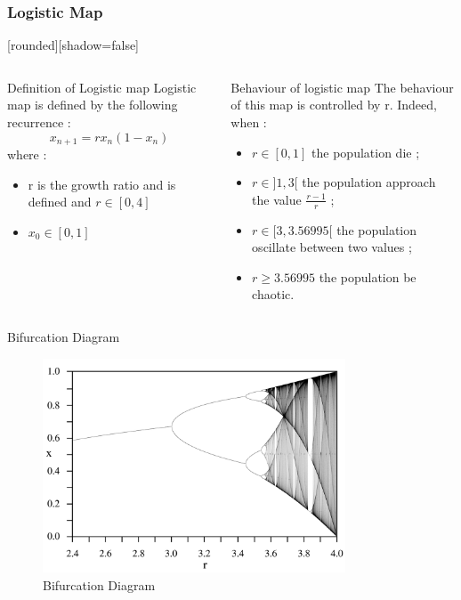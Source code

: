 \documentclass [xcolor=svgnames, t] {beamer}
\begin{document}
\begin{frame}
\frametitle{Logistic Map}
[rounded][shadow=false] 
\begin{columns}[t]
  \begin{column}{5cm}
  \begin{block}{Definition of Logistic map}
 Logistic map is defined  by the following recurrence :
$$x_{n +1} =rx_n(1 - x_n)$$ 
where :
\begin{itemize}
    \item r is the growth ratio and is defined and $r \in [0,4]$
    \item $x_0 \in [0,1]$
\end{itemize}
  \end{block} 
  \end{column}
  
  \begin{column}{5cm}
  \begin{block}{Behaviour of logistic map}
The behaviour of this map is controlled by r. Indeed, when :
\begin{itemize}
    \item $r \in [0,1]$ the population die ;
    \item  $r \in ]1,3[$ the population approach the value $\frac{r-1}{r}$ ;
    \item  $r \in [3, 3.56995[$ the population oscillate between two values ;
    \item $r \geq 3.56995$ the population be chaotic.
\end{itemize}
  \end{block}   
  \end{column}
 \end{columns}

\end{frame}

\begin{frame}{Bifurcation Diagram}
    \begin{figure}[!h]
    \begin{center}
   \caption{\label{étiquette} Bifurcation Diagram}
   \includegraphics[width=9cm]{bifurcation.png}
   \end{center}
    \end{figure}
\end{frame}
\end{document}
